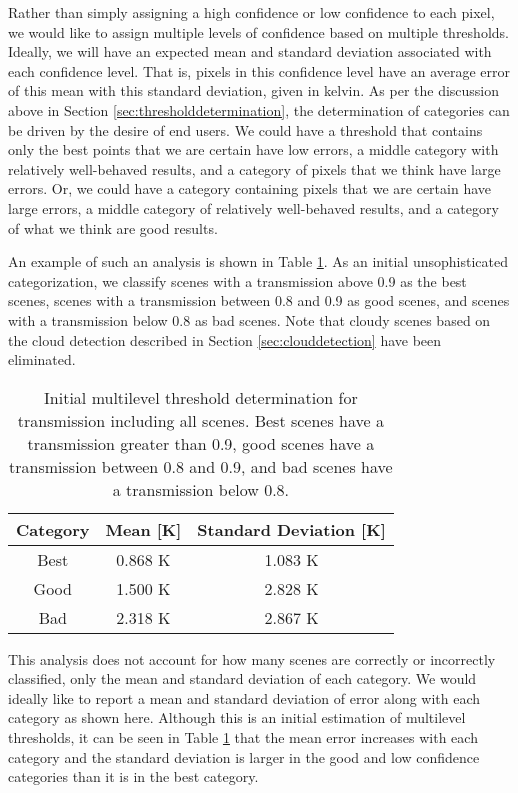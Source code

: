 \documentclass{book}
\begin{document}
Rather than simply assigning a high confidence or low confidence to each pixel, we would like to assign multiple levels of confidence based on multiple thresholds.  Ideally, we will have an expected mean and standard deviation associated with each confidence level.  That is, pixels in this confidence level have an average error of this mean with this standard deviation, given in kelvin.  As per the discussion above in Section \ref{sec:thresholddetermination}, the determination of categories can be driven by the desire of end users.  We could have a threshold that contains only the best points that we are certain have low errors, a middle category with relatively well-behaved results, and a category of pixels that we think have large errors. Or, we could have a category containing pixels that we are certain have large errors, a middle category of relatively well-behaved results, and a category of what we think are good results.

An example of such an analysis is shown in Table \ref{tab:multilevelTransmission}.  As an initial unsophisticated categorization, we classify scenes with a transmission above 0.9 as the best scenes, scenes with a transmission between 0.8 and 0.9 as good scenes, and scenes with a transmission below 0.8 as bad scenes.  Note that cloudy scenes based on the cloud detection described in Section \ref{sec:clouddetection} have been eliminated.

\begin{table}[H]
\begin{center}
\begin{tabular}{|c | c | c |}
\hline
Category & Mean [K] & Standard Deviation [K] \\ \hline
Best & 0.868 K & 1.083 K \\ \hline
Good & 1.500 K & 2.828 K \\ \hline
Bad & 2.318 K & 2.867 K \\ \hline
\end{tabular}
\caption{Initial multilevel threshold determination for transmission including all scenes.  Best scenes have a transmission greater than 0.9, good scenes have a transmission between 0.8 and 0.9, and bad scenes have a transmission below 0.8.}
\label{tab:multilevelTransmission}
\end{center}
\end{table}

This analysis does not account for how many scenes are correctly or incorrectly classified, only the mean and standard deviation of each category.  We would ideally like to report a mean and standard deviation of error along with each category as shown here.  Although this is an initial estimation of multilevel thresholds, it can be seen in Table \ref{tab:multilevelTransmission} that the mean error increases with each category and the standard deviation is larger in the good and low confidence categories than it is in the best category.
\end{document}
